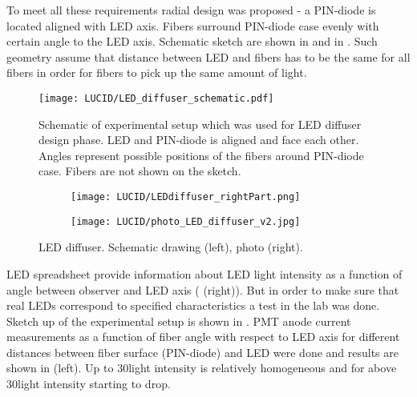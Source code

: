 To meet all these requirements radial design was proposed - a PIN-diode is located aligned with LED axis. Fibers surround PIN-diode case 
evenly with certain angle to the LED axis. Schematic sketch are shown in  and in .
Such geometry assume that distance between LED and fibers has to be the same for all fibers in order for fibers to pick up the same amount of light.
  
\begin{figure}
\centering
\texttt{[image: LUCID/LED\_diffuser\_schematic.pdf]}
\caption{Schematic of experimental setup which was used for LED diffuser design phase. LED and PIN-diode is aligned and face each other. 
	 Angles represent possible positions of the fibers around PIN-diode case. Fibers are not shown on the sketch.}
\label{fig:AngularMeasurementSetup}
\end{figure}

\begin{figure}
\begin{subfigure}{.48\textwidth}
  \centering
  \texttt{[image: LUCID/LEDdiffuser\_rightPart.png]}
\end{subfigure}
\begin{subfigure}{.48\textwidth}
  \centering
  \texttt{[image: LUCID/photo\_LED\_diffuser\_v2.jpg]}
\end{subfigure}

\caption{LED diffuser. Schematic drawing (left), photo (right).}
\label{fig:LEDDiffuser}
\end{figure}
  


LED spreadsheet provide information about LED light intensity as a function of angle between observer and LED axis ( (right)).
But in order to make sure that real LEDs correspond to specified characteristics a test in the lab was done.
Sketch up of the experimental setup is shown in .
PMT anode current measurements as a function of fiber angle with respect to LED axis for different distances between 
fiber surface (PIN-diode) and LED were done and results are shown in  (left).
Up to 30\degree light intensity is relatively homogeneous and for above 30\degree light intensity starting to drop.

